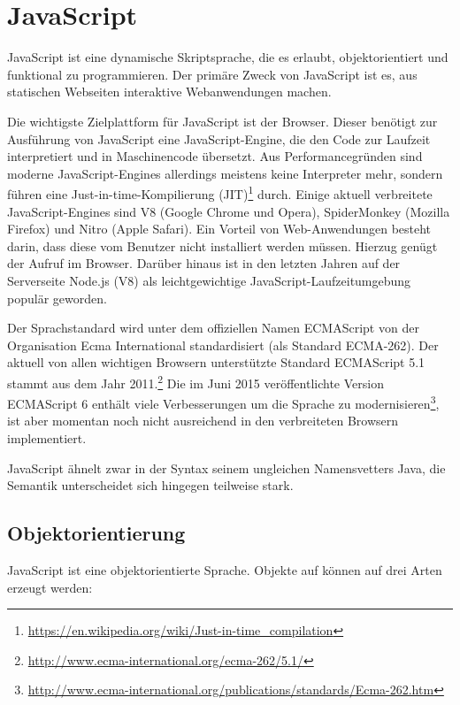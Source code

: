 \documentclass[a4paper, 12pt, hidelinks, listof=totoc, listoftables=totoc, bibliography=totoc]{scrreprt}
\begin{document}
\section{JavaScript}

JavaScript ist eine dynamische Skriptsprache, die es erlaubt, objektorientiert und funktional zu programmieren. Der primäre Zweck von JavaScript ist es, aus statischen Webseiten interaktive Webanwendungen machen\cite[S. 361]{flanagan2011.JDG}.

Die wichtigste Zielplattform für JavaScript ist der Browser. Dieser benötigt zur Ausführung von JavaScript eine JavaScript-Engine, die den Code zur Laufzeit interpretiert und in Maschinencode übersetzt. Aus Performancegründen sind moderne JavaScript-Engines allerdings meistens keine Interpreter mehr, sondern führen eine Just-in-time-Kompilierung (JIT)\footnote{\url{https://en.wikipedia.org/wiki/Just-in-time_compilation}} durch. Einige aktuell verbreitete JavaScript-Engines sind V8 (Google Chrome und Opera), SpiderMonkey (Mozilla Firefox) und Nitro (Apple Safari). Ein Vorteil von Web-Anwendungen besteht darin, dass diese vom Benutzer nicht installiert werden müssen. Hierzug genügt der Aufruf im Browser. Darüber hinaus ist in den letzten Jahren auf der Serverseite Node.js (V8) als leichtgewichtige JavaScript-Laufzeitumgebung populär geworden.

Der Sprachstandard wird unter dem offiziellen Namen ECMAScript von der Organisation Ecma International standardisiert (als Standard ECMA-262). Der aktuell von allen wichtigen Browsern unterstützte Standard ECMAScript 5.1 stammt aus dem Jahr 2011.\footnote{\url{http://www.ecma-international.org/ecma-262/5.1/}} Die im Juni 2015 veröffentlichte Version ECMAScript 6 enthält viele Verbesserungen um die Sprache zu modernisieren\footnote{\url{http://www.ecma-international.org/publications/standards/Ecma-262.htm}}, ist aber momentan noch nicht ausreichend in den verbreiteten Browsern implementiert.

JavaScript ähnelt zwar in der Syntax seinem ungleichen Namensvetters Java, die Semantik unterscheidet sich hingegen teilweise stark\cite{eich1996.JSL}.


\subsection{Objektorientierung}\label{subsec:js-oo}

JavaScript ist eine objektorientierte Sprache. Objekte auf können auf drei Arten erzeugt werden:
\end{document}
